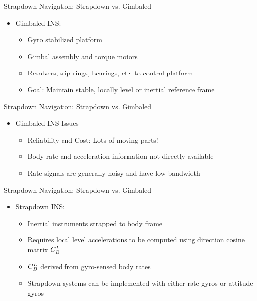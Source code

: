 \begin{frame}
Strapdown Navigation:  Strapdown vs. Gimbaled
\begin{itemize}
  \item Gimbaled INS:
  \begin{itemize}
	\item Gyro stabilized platform
	\item Gimbal assembly and torque motors
	\item Resolvers, slip rings, bearings, etc. to control  platform
	\item Goal: Maintain stable, locally level or inertial reference frame
  \end{itemize}
\end{itemize} 
\end{frame}


\begin{frame}
Strapdown Navigation: Strapdown vs. Gimbaled
\begin{itemize}
  \item Gimbaled INS Issues
  \begin{itemize}
	\item Reliability and Cost: Lots of moving parts!
	\item Body rate and acceleration information not directly available
	\item Rate signals are generally noisy and have low bandwidth
  \end{itemize}
\end{itemize} 
\end{frame}


\begin{frame}
Strapdown Navigation: Strapdown vs. Gimbaled
\begin{itemize}
  \item Strapdown INS:
  \begin{itemize}
	\item Inertial instruments strapped to body frame
	\item Requires local level accelerations to be computed using direction cosine matrix $C_{B}^{L}$
	\item $C_{B}^{L}$ derived from gyro-sensed body rates
    \item Strapdown systems can be implemented with either rate gyros or attitude gyros 
  \end{itemize} 
\end{itemize} 
\end{frame}

